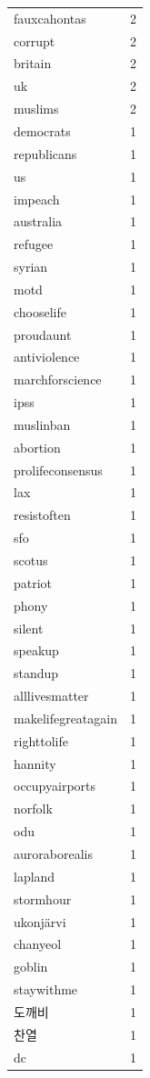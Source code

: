 \begin{tabular}{lr}
fauxcahontas & 2 \\
corrupt & 2 \\
britain & 2 \\
uk & 2 \\
muslims & 2 \\
democrats & 1 \\
republicans & 1 \\
us & 1 \\
impeach & 1 \\
australia & 1 \\
refugee & 1 \\
syrian & 1 \\
motd & 1 \\
chooselife & 1 \\
proudaunt & 1 \\
antiviolence & 1 \\
marchforscience & 1 \\
ipss & 1 \\
muslinban & 1 \\
abortion & 1 \\
prolifeconsensus & 1 \\
lax & 1 \\
resistoften & 1 \\
sfo & 1 \\
scotus & 1 \\
patriot & 1 \\
phony & 1 \\
silent & 1 \\
speakup & 1 \\
standup & 1 \\
alllivesmatter & 1 \\
makelifegreatagain & 1 \\
righttolife & 1 \\
hannity & 1 \\
occupyairports & 1 \\
norfolk & 1 \\
odu & 1 \\
auroraborealis & 1 \\
lapland & 1 \\
stormhour & 1 \\
ukonjärvi & 1 \\
chanyeol & 1 \\
goblin & 1 \\
staywithme & 1 \\
도깨비 & 1 \\
찬열 & 1 \\
dc & 1 \\

\end{tabular}
